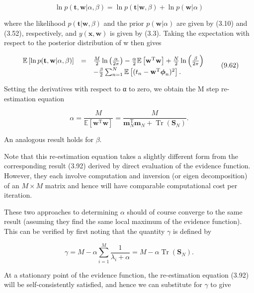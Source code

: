 \documentclass[
  10
]{article}
\begin{document}
\[
\ln p (\mathbf {t}, \mathbf {w} | \alpha , \beta) = \ln p (\mathbf {t} | \mathbf {w}, \beta) + \ln p (\mathbf {w} | \alpha)\tag{9.61}
\]

where the likelihood \(p ( \mathbf { t } | \mathbf { w } , \beta )\) and
the prior \(p ( \mathbf { w } | \alpha )\) are given by (3.10) and
(3.52), respectively, and \(y ( \mathbf { x } , \mathbf { w } )\) is
given by (3.3). Taking the expectation with respect to the posterior
distribution of w then gives

\[
\begin{array}{r c l} \mathbb {E} \left[ \ln p (\mathbf {t}, \mathbf {w} | \alpha , \beta) \right] & = & \frac {M}{2} \ln \left(\frac {\alpha}{2 \pi}\right) - \frac {\alpha}{2} \mathbb {E} \left[ \mathbf {w} ^ {\mathrm{T}} \mathbf {w} \right] + \frac {N}{2} \ln \left(\frac {\beta}{2 \pi}\right) \\ & & - \frac {\beta}{2} \sum_ {n = 1} ^ {N} \mathbb {E} \left[ (t _ {n} - \mathbf {w} ^ {\mathrm{T}} \boldsymbol {\phi} _ {n}) ^ {2} \right]. \end{array}\tag{9.62}
\]

Setting the derivatives with respect to α to zero, we obtain the M step
re-estimation equation

\[
\alpha = \frac {M}{\mathbb {E} \left[ \mathbf {w} ^ {\mathrm{T}} \mathbf {w} \right]} = \frac {M}{\mathbf {m} _ {N} ^ {\mathrm{T}} \mathbf {m} _ {N} + \operatorname{Tr} (\mathbf {S} _ {N})}.\tag{9.63}
\]

An analogous result holds for \(\beta .\)

Note that this re-estimation equation takes a slightly different form
from the corresponding result (3.92) derived by direct evaluation of the
evidence function. However, they each involve computation and inversion
(or eigen decomposition) of an \(M \times M\) matrix and hence will have
comparable computational cost per iteration.

These two approaches to determining \(\alpha\) should of course converge
to the same result (assuming they find the same local maximum of the
evidence function). This can be verified by first noting that the
quantity \(\gamma\) is defined by

\[
\gamma = M - \alpha \sum_ {i = 1} ^ {M} \frac {1}{\lambda_ {i} + \alpha} = M - \alpha \operatorname{Tr} (\mathbf {S} _ {N}).\tag{9.64}
\]

At a stationary point of the evidence function, the re-estimation
equation (3.92) will be self-consistently satisfied, and hence we can
substitute for \(\gamma\) to give
\end{document}
